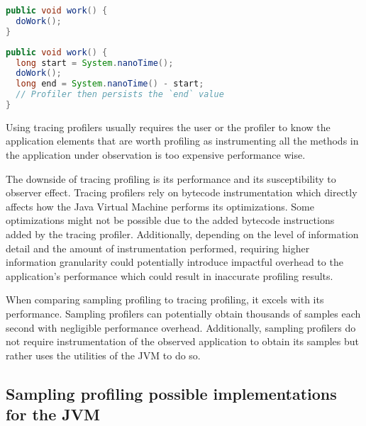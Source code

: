 \documentclass[..thesis.tex]{subfiles}
\begin{document}
\begin{minipage}[b]{.45\textwidth}
\begin{lstlisting}[language=java,style=def,label={lst:uninstrumented}, caption={Original source}]
public void work() {
  doWork();
}
\end{lstlisting}
\end{minipage}\hspace{12mm}
\begin{minipage}[b]{.45\textwidth}
\begin{lstlisting}[language=java,style=def,label={lst:instrumented}, caption={Instrumented source}]
public void work() {
  long start = System.nanoTime();
  doWork();
  long end = System.nanoTime() - start;
  // Profiler then persists the `end` value
}
\end{lstlisting}
\end{minipage}



Using tracing profilers usually requires the user or the profiler to know the application elements that are worth profiling as instrumenting all the methods in the application under observation is too expensive performance wise. 

The downside of tracing profiling is its performance and its susceptibility to observer effect. Tracing profilers rely on bytecode instrumentation which directly affects how the Java Virtual Machine performs its optimizations. Some optimizations might not be possible due to the added bytecode instructions added by the tracing profiler. Additionally, depending on the level of information detail and the amount of instrumentation performed, requiring higher information granularity could potentially introduce impactful overhead to the application's performance which could result in inaccurate profiling results. 

When comparing sampling profiling to tracing profiling, it excels with its performance. Sampling profilers can potentially obtain thousands of samples each second with negligible performance overhead. Additionally, sampling profilers do not require instrumentation of the observed application to obtain its samples but rather uses the utilities of the JVM to do so.

\subsection{Sampling profiling possible implementations for the JVM}
\end{document}
